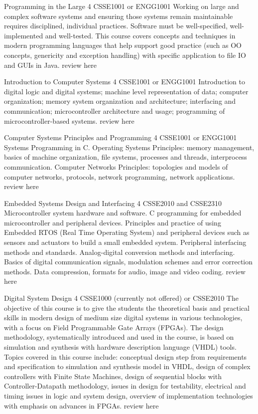 	{Programming in the Large}
	{4}
	{CSSE1001 or ENGG1001}
	{}
	{}
	{Working on large and complex software systems and ensuring those systems remain maintainable requires disciplined, individual practices. Software must be well-specified, well-implemented and well-tested. This course covers concepts and techniques in modern programming languages that help support good practice (such as OO concepts, genericity and exception handling) with specific application to file IO and GUIs in Java.}
	{review here}

	{Introduction to Computer Systems}
	{4}
	{CSSE1001 or ENGG1001}
	{}
	{}
	{Introduction to digital logic and digital systems; machine level representation of data; computer organization; memory system organization and architecture; interfacing and communication; microcontroller architecture and usage; programming of microcontroller-based systems.}
	{review here}

	{Computer Systems Principles and Programming}
	{4}
	{CSSE1001 or ENGG1001}
	{}
	{}
	{Systems Programming in C. Operating Systems Principles: memory management, basics of machine organization, file systems, processes and threads, interprocess communication. Computer Networks Principles: topologies and models of computer networks, protocols, network programming, network applications.}
	{review here}

	{Embedded Systems Design and Interfacing}
	{4}
	{CSSE2010 and CSSE2310}
	{}
	{}
	{Microcontroller system hardware and software. C programming for embedded microcontroller and peripheral devices. Principles and practice of using Embedded RTOS (Real Time Operating System) and peripheral devices such as sensors and actuators to build a small embedded system. Peripheral interfacing methods and standards. Analog-digital conversion methods and interfacing. Basics of digital communication signals, modulation schemes and error correction methods. Data compression, formats for audio, image and video coding.}
	{review here}

	{Digital System Design}
	{4}
	{CSSE1000 (currently not offered) or CSSE2010}
	{}
	{}
	{The objective of this course is to give the students the theoretical basis and practical skills in modern design of medium size digital systems in various technologies, with a focus on Field Programmable Gate Arrays (FPGAs). The design methodology, systematically introduced and used in the course, is based on simulation and synthesis with hardware description language (VHDL) tools. Topics covered in this course include: conceptual design step from requirements and specification to simulation and synthesis model in VHDL, design of complex controllers with Finite State Machines, design of sequential blocks with Controller-Datapath methodology, issues in design for testability, electrical and timing issues in logic and system design, overview of implementation technologies with emphasis on advances in FPGAs.}
	{review here}

